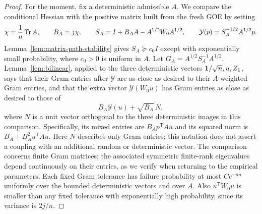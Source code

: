 \begin{proof}
For the moment, fix a deterministic admissible $A$. We compare the
conditional Hessian with the positive matrix built from the fresh GOE
by setting
\[
 \chi=\frac1n\operatorname{Tr} A,\qquad B_A=j\chi,\qquad
 S_A=I+B_AA-A^{1/2}W_0A^{1/2},\qquad
 \mathcal Y(p)=S_A^{-1/2}A^{1/2}p.
\]
Lemma~\ref{lem:matrix-path-stability} gives $S_A\succeq c_0I$ except
with exponentially small probability, where $c_0>0$ is uniform in
$A$.  Let $G_A=A^{1/2}S_A^{-1}A^{1/2}$.  Lemma~\ref{lem:bilinear},
applied to the three deterministic vectors
$\mathbf 1/\sqrt n,u,Z_1$, says that their Gram entries after $\mathcal Y$
are as close as desired to their $A$-weighted Gram entries, and that
the extra vector $\mathcal Y(W_0u)$ has Gram entries as close as desired
to those of
\begin{equation}
 B_A\mathcal Y(u)+\sqrt{B_A}\,N,
 \label{eq:extra-whitened-vector}
\end{equation}
where $N$ is a unit vector orthogonal to the three deterministic
images in this comparison.  Specifically, its mixed entries are
$B_Ap^{\mathsf T}Au$ and its squared norm is
$B_A+B_A^2u^{\mathsf T}Au$. Here $N$ describes only Gram entries;
this notation does not assert a coupling with an additional random or
deterministic vector. The comparison concerns finite Gram matrices; the
associated symmetric finite-rank eigenvalues depend continuously on their
entries, as we verify when returning to the empirical parameters. Each fixed
Gram tolerance has failure probability at most $Ce^{-a n}$ uniformly
over the bounded deterministic vectors and over $A$.  Also
$u^{\mathsf T}W_0u$ is smaller than any fixed tolerance with
exponentially high probability, since its variance is $2j/n$.


\end{proof}
